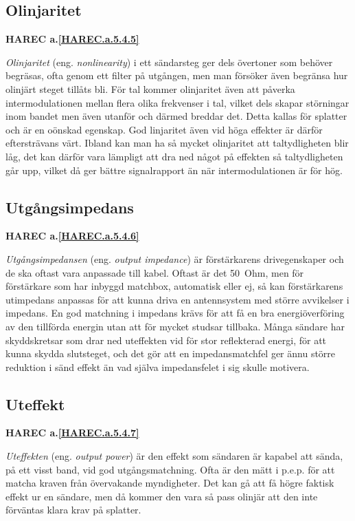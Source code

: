 \subsection{Olinjaritet}
\textbf{HAREC
  a.\ref{HAREC.a.5.4.5}\label{myHAREC.a.5.4.5}
}

\emph{Olinjaritet} (eng. \emph{nonlinearity}) i ett sändarsteg ger dels
övertoner som behöver begräsas, ofta genom ett filter på utgången, men man
försöker även begränsa hur olinjärt steget tillåts bli.
För tal kommer olinjaritet även att påverka intermodulationen mellan flera
olika frekvenser i tal, vilket dels skapar störningar inom bandet men även
utanför och därmed breddar det.
Detta kallas för splatter och är en oönskad egenskap.
God linjaritet även vid höga effekter är därför eftersträvans värt.
Ibland kan man ha så mycket olinjaritet att taltydligheten blir låg, det
kan därför vara lämpligt att dra ned något på effekten så taltydligheten går
upp, vilket då ger bättre signalrapport än när intermodulationen är för hög.

\subsection{Utgångsimpedans}
\textbf{HAREC
  a.\ref{HAREC.a.5.4.6}\label{myHAREC.a.5.4.6}
}

\emph{Utgångsimpedansen} (eng. \emph{output impedance}) är förstärkarens
drivegenskaper och de ska oftast vara anpassade till kabel.
Oftast är det 50~Ohm, men för förstärkare som har inbyggd matchbox,
automatisk eller ej, så kan förstärkarens utimpedans anpassas
för att kunna driva en antennsystem med större avvikelser i impedans.
En god matchning i impedans krävs för att få en bra energiöverföring av den
tillförda energin utan att för mycket studsar tillbaka.
Många sändare har skyddskretsar som drar ned uteffekten vid för stor
reflekterad energi, för att kunna skydda slutsteget, och det gör att en
impedansmatchfel ger ännu större reduktion i sänd effekt än vad själva
impedansfelet i sig skulle motivera.

\subsection{Uteffekt}
\textbf{HAREC
  a.\ref{HAREC.a.5.4.7}\label{myHAREC.a.5.4.7}
}

\emph{Uteffekten} (eng. \emph{output power}) är den effekt som sändaren är
kapabel att sända, på ett visst band, vid god utgångsmatchning.
Ofta är den mätt i p.e.p. för att matcha kraven från övervakande myndigheter.
Det kan gå att få högre faktisk effekt ur en sändare, men då kommer den vara
så pass olinjär att den inte förväntas klara krav på splatter.

